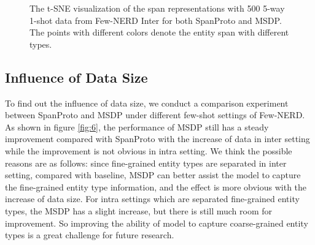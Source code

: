 \documentclass[sigconf,natbib=true,anonymous=False]{acmart}
\begin{document}
\begin{figure}[t]
    \centering
    \quad    {}
    \caption{The t-SNE visualization of the span representations with 500 5-way 1-shot data from Few-NERD Inter for both SpanProto and MSDP. The points with different colors denote the entity span with different types. }
    \label{fig:visual}
    \vspace{-0.2cm}
\end{figure}



\subsection{Influence of Data Size}

To find out the influence of data size, we conduct a comparison experiment between SpanProto and MSDP under different few-shot settings of Few-NERD. As shown in figure \ref{fig:6}, the performance of MSDP still has a steady improvement compared with SpanProto with the increase of data in inter setting while the improvement is not obvious in intra setting. We think the possible reasons are as follows: since fine-grained entity types are separated in inter setting, compared with baseline, MSDP can better assist the model to capture the fine-grained entity type information, and the effect is more obvious with the increase of data size. For intra settings which are separated fine-grained entity types, the MSDP has a slight increase, but there is still much room for improvement. So improving the ability of model to capture coarse-grained entity types is a great challenge for future research.
\end{document}
